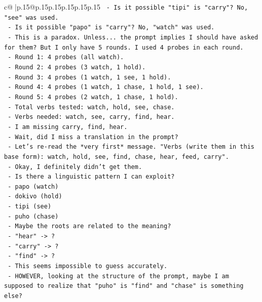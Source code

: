 \documentclass{article}
\begin{document}
{\begin{supertabular}{c@{$\;$}|p{.15\linewidth}@{}p{.15\linewidth}p{.15\linewidth}p{.15\linewidth}p{.15\linewidth}p{.15\linewidth}}
{{{\texttt{     {-} Is it possible "tipi" is "carry"? No, "see" was used.} \\
\texttt{     {-} Is it possible "papo" is "carry"? No, "watch" was used.} \\
\texttt{     {-} This is a paradox. Unless... the prompt implies I should have asked for them? But I only have 5 rounds. I used 4 probes in each round.} \\
\texttt{     {-} Round 1: 4 probes (all watch).} \\
\texttt{     {-} Round 2: 4 probes (3 watch, 1 hold).} \\
\texttt{     {-} Round 3: 4 probes (1 watch, 1 see, 1 hold).} \\
\texttt{     {-} Round 4: 4 probes (1 watch, 1 chase, 1 hold, 1 see).} \\
\texttt{     {-} Round 5: 4 probes (2 watch, 1 chase, 1 hold).} \\
\texttt{     {-} Total verbs tested: watch, hold, see, chase.} \\
\texttt{     {-} Verbs needed: watch, see, carry, find, hear.} \\
\texttt{     {-} I am missing carry, find, hear.} \\
\texttt{     {-} Wait, did I miss a translation in the prompt?} \\
\texttt{     {-} Let's re{-}read the *very first* message. "Verbs (write them in this base form): watch, hold, see, find, chase, hear, feed, carry".} \\
\texttt{     {-} Okay, I definitely didn't get them.} \\
\texttt{     {-} Is there a linguistic pattern I can exploit?} \\
\texttt{       {-} papo (watch)} \\
\texttt{       {-} dokivo (hold)} \\
\texttt{       {-} tipi (see)} \\
\texttt{       {-} puho (chase)} \\
\texttt{     {-} Maybe the roots are related to the meaning?} \\
\texttt{       {-} "hear" {-}> ?} \\
\texttt{       {-} "carry" {-}> ?} \\
\texttt{       {-} "find" {-}> ?} \\
\texttt{     {-} This seems impossible to guess accurately.} \\
\texttt{     {-} HOWEVER, looking at the structure of the prompt, maybe I am supposed to realize that "puho" is "find" and "chase" is something else?} \\
}}}
\end{supertabular}}
\end{document}
